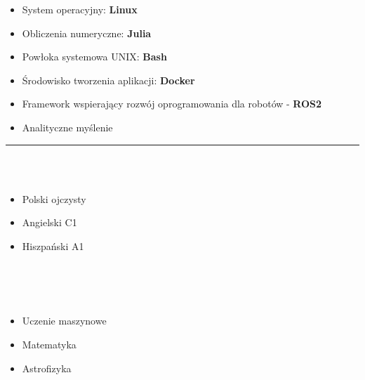 \documentclass[10pt]{article}
\begin{document}
\begin{paracol}{2}
\begin{leftcolumn}
\begin{itemize}[leftmargin=*]
        \item System operacyjny: \textbf{Linux}
        \item Obliczenia numeryczne: \textbf{Julia}
        \item Powłoka systemowa UNIX: \textbf{Bash} 
        \item Środowisko tworzenia aplikacji: \textbf{Docker}
        \item Framework wspierający rozwój oprogramowania dla robotów - \textbf{ROS2}
        \item Analityczne myślenie
    \end{itemize}

    \rule{6cm}{1pt} \\ \\
    \fontsize{10pt}{10pt}
    \begin{itemize}[leftmargin=*]
        \setlength{\parskip}{0pt}
        \item Polski ojczysty
        \item Angielski C1
        \item Hiszpański A1
    \end{itemize}
    \vspace{1500pt}
    \rule{0pt}{0pt} \\ \\ \\
    \fontsize{10pt}{10pt}
    \begin{itemize}[leftmargin=*]
        \setlength{\parskip}{0pt}
        \item Uczenie maszynowe
        \item Matematyka
        \item Astrofizyka
    \end{itemize}
\end{leftcolumn}


\end{paracol}
\end{document}
